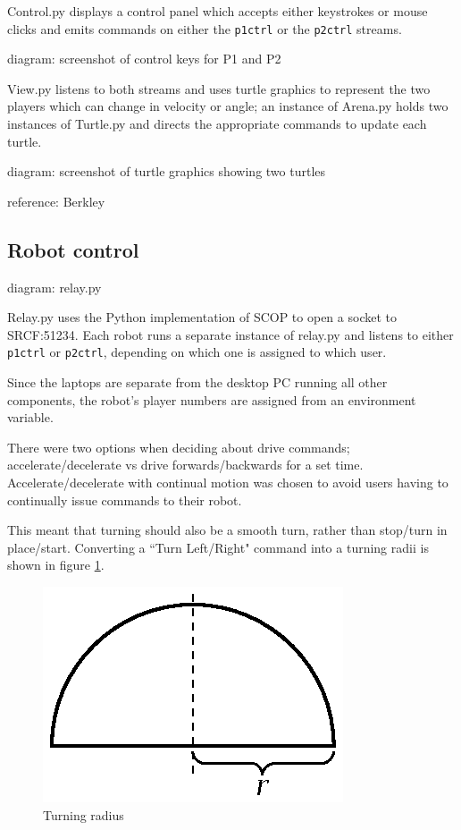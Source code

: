 \documentclass[12pt,a4,notitlepage]{report}
\renewcommand{\_}{\texttt{\symbol{95}}}
\newcommand{\<}{\texttt{\symbol{60}}}
\renewcommand{\>}{\texttt{\symbol{62}}}
\newcommand{\scopendpoint}[1]{\texttt{#1}}
\begin{document}
{Control.py displays a control panel which accepts either keystrokes or mouse clicks and emits commands on either the \scopendpoint{p1ctrl} or the \scopendpoint{p2ctrl} streams.

{diagram: screenshot of control keys for P1 and P2}

View.py listens to both streams and uses turtle graphics to represent the two players which can change in velocity or angle; an instance of Arena.py holds two instances of Turtle.py and directs the appropriate commands to update each turtle.

{diagram: screenshot of turtle graphics showing two turtles}

{reference: Berkley}

\subsection{Robot control}

{diagram: relay.py}

Relay.py uses the Python implementation of SCOP to open a socket to SRCF:51234. Each robot runs a separate instance of relay.py and listens to either \scopendpoint{p1ctrl} or \scopendpoint{p2ctrl}, depending on which one is assigned to which user. 

Since the laptops are separate from the desktop PC running all other components, the robot's player numbers are assigned from an environment variable.

There were two options when deciding about drive commands; accelerate/decelerate vs drive forwards/backwards for a set time. Accelerate/decelerate with continual motion was chosen to avoid users having to continually issue commands to their robot.

This meant that turning should also be a smooth turn, rather than stop/turn in place/start. Converting a ``Turn Left/Right" command into a turning radii is shown in figure \ref{tradius}.

\begin{figure}
\centering
\includegraphics[scale=1.0,angle=0]{diagrams/turningradius.ps}
\caption{Turning radius}
\label{tradius}
\end{figure}


}
\end{document}
